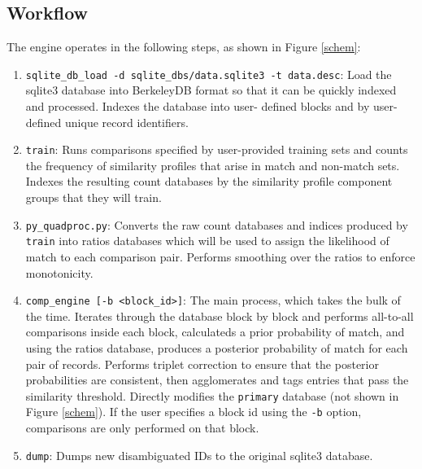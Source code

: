 \documentclass[10pt, letterpaper]{article}
\begin{document}
\subsection{Workflow}
The engine operates in the following steps, as shown in Figure \ref{schem}:
\begin{enumerate}
\item \texttt{sqlite\_db\_load -d sqlite\_dbs/data.sqlite3 -t data.desc}: Load the sqlite3 database into
BerkeleyDB format so that it can be quickly indexed and processed. Indexes the database into user-
defined blocks and by user-defined unique record identifiers. 
\item \texttt{train}: Runs comparisons specified by user-provided training sets and counts the
frequency of similarity profiles that arise in match and non-match sets. Indexes the resulting
count databases by the similarity profile component groups that they will train.
\item \texttt{py\_quadproc.py}: Converts the raw count databases and indices produced by \texttt{train}
into ratios databases which will be used to assign the likelihood of match to each comparison pair. Performs
smoothing over the ratios to enforce monotonicity.
\item \texttt{comp\_engine [-b <block\_id>]}: The main process, which takes the bulk of the time.
Iterates through the database block by block
and performs all-to-all comparisons inside each block, calculateds a prior probability of match, and using the
ratios database, produces a posterior probability of match for each pair of records. Performs triplet
correction to ensure that the posterior probabilities are consistent, then agglomerates and tags entries that
pass the similarity threshold. Directly modifies the \texttt{primary} database (not shown in Figure \ref{schem}).
If the user specifies a block id using the \texttt{-b} option, comparisons are only performed on that block.
\item \texttt{dump}: Dumps new disambiguated IDs to the original sqlite3 database.
\end{enumerate}
\end{document}
